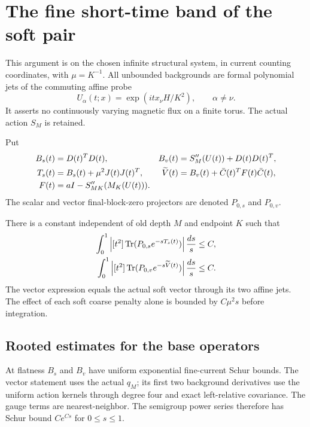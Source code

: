 \section{The fine short-time band of the soft pair}
\label{suv-section}

This argument is on the chosen infinite structural system, in current
counting coordinates, with $\mu=K^{-1}$. All unbounded backgrounds are
formal polynomial jets of the commuting affine probe
\[
 U_\alpha(t;x)=\exp(i t x_\nu H/K^2),\qquad \alpha\ne\nu.
\]
It asserts no continuously varying magnetic flux on a finite torus.
The actual action $S_M$ is retained.

Put
\begin{align}
 B_s(t)&=D(t)^TD(t),&
 B_v(t)&=S_M''(U(t))+D(t)D(t)^T,\notag\\
 T_s(t)&=B_s(t)+\mu^2J(t)J(t)^T,&
 \widetilde V(t)&=B_v(t)+\bar C(t)^TF(t)\bar C(t),\notag\\
 F(t)&=aI-S_{MK}''(M_K(U(t))).
 \label{suv-operators}
\end{align}
The scalar and vector final-block-zero projectors are denoted
$P_{0,s}$ and $P_{0,v}$.

\begin{theorem}
\label{suv-main}
There is a constant independent of old depth $M$ and endpoint $K$ such
that
\begin{align}
 \int_0^1\left|[t^2]\operatorname{Tr}
       (P_{0,s}e^{-sT_s(t)})\right|\frac{ds}{s}&\le C,\notag\\
 \int_0^1\left|[t^2]\operatorname{Tr}
       (P_{0,v}e^{-s\widetilde V(t)})\right|\frac{ds}{s}&\le C.
 \label{suv-bounds}
\end{align}
The vector expression equals the actual soft vector through its two
affine jets. The effect of each soft coarse penalty alone is bounded
by $C\mu^2s$ before integration.
\end{theorem}

\subsection{Rooted estimates for the base operators}
\label{suv-base-section}

At flatness $B_s$ and $B_v$ have uniform exponential fine-current
Schur bounds. The vector statement uses the actual $q_M$; its first
two background derivatives use the uniform action kernels through
degree four and exact left-relative covariance. The gauge terms
are nearest-neighbor. The semigroup power series therefore has
Schur bound $Ce^{Cs}$ for $0\le s\le1$.

